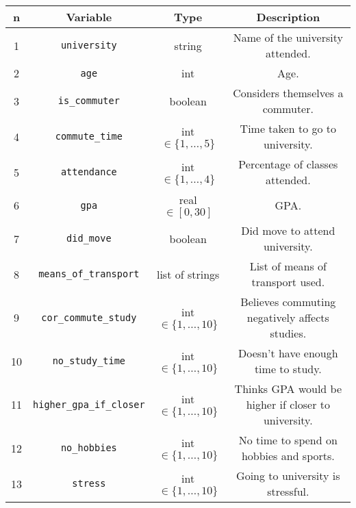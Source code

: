 \documentclass[11pt]{extarticle}
\numberwithin{table}{section}
\numberwithin{figure}{section}
\numberwithin{equation}{section}
\begin{document}
\begin{table}[!ht]
	\centering
	\tiny
	\begin{tabular}{|c|c|c|c|}
		\hline
		\textbf{n} & \textbf{Variable}                & \textbf{Type}              & \textbf{Description}                                \\
		\hline
		1          & \texttt{university}              & string                     & Name of the university attended.                    \\
		2          & \texttt{age}                     & int                        & Age.                                                \\
		3          & \texttt{is\_commuter}            & boolean                    & Considers themselves a commuter.                    \\
		4          & \texttt{commute\_time}           & int $\in \{1, \dots, 5\}$  & Time taken to go to university.                     \\
		5          & \texttt{attendance}              & int $\in \{1, \dots, 4\}$  & Percentage of classes attended.                     \\
		6          & \texttt{gpa}                     & real $\in [0,30]$          & GPA.                                                \\
		7          & \texttt{did\_move}               & boolean                    & Did move to attend university.                      \\
		8          & \texttt{means\_of\_transport}    & list of strings            & List of means of transport used.                    \\
		9          & \texttt{cor\_commute\_study}     & int $\in \{1, \dots, 10\}$ & Believes commuting negatively affects studies.      \\
		10         & \texttt{no\_study\_time}         & int $\in \{1, \dots, 10\}$ & Doesn't have enough time to study.                  \\
		11         & \texttt{higher\_gpa\_if\_closer} & int $\in \{1, \dots, 10\}$ & Thinks GPA would be higher if closer to university. \\
		12         & \texttt{no\_hobbies}             & int $\in \{1, \dots, 10\}$ & No time to spend on hobbies and sports.             \\
		13         & \texttt{stress}                  & int $\in \{1, \dots, 10\}$ & Going to university is stressful.                   \\

\end{tabular}
\end{table}
\end{document}
